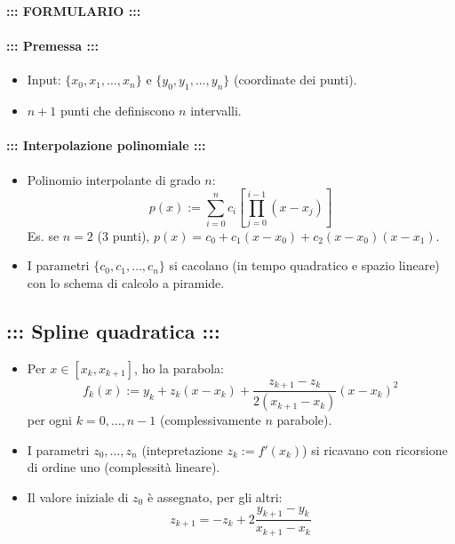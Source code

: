 \documentclass[a4paper,12pt]{amsart}
\begin{document}
\onehalfspacing
\renewcommand{\baselinestretch}{1.5} 
\clearpage\thispagestyle{empty}
\begin{center}
{\Large \bf ::: FORMULARIO :::}
\end{center}

\vskip 3mm
\paragraph{\bf ::: Premessa :::}
\begin{itemize} 
\item Input: $\{x_0,x_1,\ldots,x_n\}$ e $\{y_0,y_1,\ldots,y_n\}$ (coordinate dei punti).
\item $n+1$ punti che definiscono $n$ intervalli.
\end{itemize}
\vskip 3mm
\paragraph{\bf ::: Interpolazione polinomiale :::}
\begin{itemize} 
\item Polinomio interpolante di grado $n$:
$$p(x):=\sum_{i=0}^n c_i \left[ \prod_{j=0}^{i-1} (x-x_j) \right]$$
Es. se $n=2$ (3 punti), $p(x)=c_0+c_1(x-x_0)+c_2(x-x_0)(x-x_1)$.
\item I parametri $\{c_0,c_1,\ldots,c_n\}$ si cacolano (in tempo quadratico e spazio lineare) con lo schema di calcolo a piramide.
\end{itemize}

\subsection*{\bf ::: Spline quadratica :::}
\begin{itemize}
\item Per $x\in[x_k,x_{k+1}]$, ho la parabola:
$$f_k(x):= y_k+z_k(x-x_k)+\frac{z_{k+1}-z_k}{2(x_{k+1}-x_k)} (x-x_k)^2$$
per ogni $k=0,...,n-1$ (complessivamente $n$ parabole).
\item I parametri $z_0,\ldots,z_n$ (intepretazione $z_k:=f'(x_k)$) si ricavano con ricorsione di ordine uno (complessit\`a lineare).
\item Il valore iniziale di $z_0$ \`e assegnato, per gli altri:
$$z_{k+1} = -z_k + 2 \frac{y_{k+1}-y_k}{x_{k+1}-x_k}$$
\end{itemize}
\end{document}

